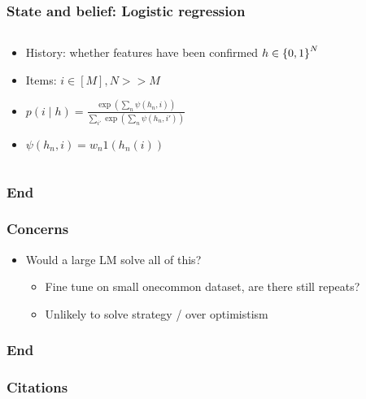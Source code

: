 \documentclass{beamer}
\begin{document}
\begin{frame}
\frametitle{State and belief: Logistic regression}
\begin{columns}
\begin{column}{0.55\textwidth}
\begin{itemize}
\item History: whether features have been confirmed $h \in \left\{0,1\right\}^N$
\item Items: $i \in [M], N >> M$
\item $p(i \mid h) = \frac{\exp(\sum_n \psi(h_n, i))}{\sum_{i'} \exp(\sum_n\psi(h_n, i'))}$
\item $\psi(h_n, i) = w_n 1(h_n(i))$ 
\end{itemize}
\end{column}
\begin{column}{0.45\textwidth}
\centering
{}
\end{column}
\end{columns}
\end{frame}

\begin{frame}
\frametitle{End}
\end{frame}


\begin{frame}
\frametitle{Concerns}
\begin{itemize}
\item Would a large LM solve all of this?
    \begin{itemize}
    \item Fine tune on small onecommon dataset, are there still repeats?
    \item Unlikely to solve strategy / over optimistism
    \end{itemize}
\end{itemize}
\end{frame}

\begin{frame}
\frametitle{End}
\end{frame}



\begin{frame}[allowframebreaks]
\frametitle{Citations}

\end{frame}
\end{document}
